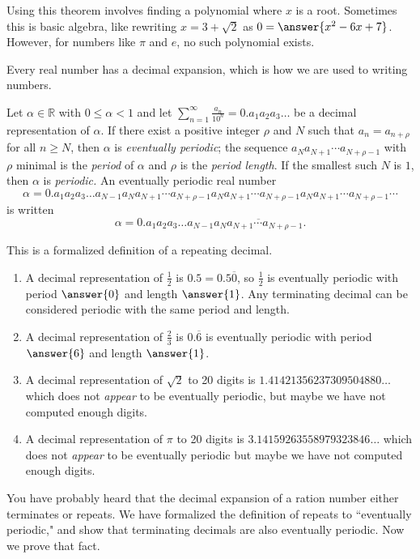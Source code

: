 \documentclass{ximera}
\begin{document}
Using this theorem involves finding a polynomial where $x$ is a root. Sometimes this is basic algebra, like rewriting $x=3+\sqrt{2}$ as $0=\answer{x^2-6x+7}$. However, for numbers like $\pi$ and $e$, no such polynomial exists.

Every real number has a decimal expansion, which is how we are used to writing numbers. 

\begin{definition}
 Let $\alpha\in\mathbb{R}$ with $0\leq\alpha<1$ and let $\displaystyle\sum_{n=1}^\infty \frac{a_n}{10^n}=0.a_1a_2a_3\dots$ be a decimal representation of $\alpha$. If there exist a positive integer $\rho$ and $N$ such that $a_n=a_{n+\rho}$ for all $n\geq N$, then $\alpha$ is \emph{eventually periodic}; the sequence $a_Na_{N+1}\cdots a_{N+\rho-1}$ with $\rho$ minimal is the \emph{period} of $\alpha$ and $\rho$ is the \emph{period length}. If the smallest such $N$ is $1$, then $\alpha$ is \emph{periodic.}  An eventually periodic real number
 \[\alpha=0.a_1a_2a_3\dots a_{N-1}a_Na_{N+1}\cdots a_{N+\rho-1}a_Na_{N+1}\cdots a_{N+\rho-1}a_Na_{N+1}\cdots a_{N+\rho-1}\cdots\] is written \[\alpha=0.a_1a_2a_3\dots a_{N-1}\overline{a_Na_{N+1}\cdots a_{N+\rho-1}}.\]
\end{definition}
This is a formalized definition of a repeating decimal. 

\begin{example}
\begin{enumerate}
 \item A decimal representation of $\frac{1}{2}$ is $0.5=0.5\overline{0}$, so $\frac{1}{2}$ is eventually periodic with period $\answer{0}$ and length $\answer{1}$. Any terminating decimal can be considered periodic with the same period and length.
 \item A decimal representation of $\frac{2}{3}$ is $0.\overline{6}$ is eventually periodic with period $\answer{6}$ and length $\answer{1}$.
 \item A decimal representation of $\sqrt{2}$ to 20 digits is $1.41421356237309504880\dots$ which does not \emph{appear} to be eventually periodic, but maybe we have not computed enough digits.
 \item  A decimal representation of $\pi$ to 20 digits is $3.14159263558979323846\dots$ which does not \emph{appear} to be eventually periodic but maybe we have not computed enough digits.
\end{enumerate}
\end{example}

You have probably heard that the decimal expansion of a ration number either terminates or repeats. We have formalized the definition of repeats to ``eventually periodic," and show that terminating decimals are also eventually periodic. Now we prove that fact.
\end{document}
